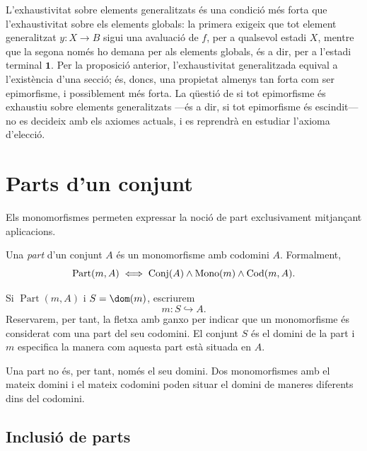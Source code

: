 \begin{observacio}\label{obs:exhaustiva-generalitzada-global}
L'exhaustivitat sobre elements generalitzats és una condició més forta que l'exhaustivitat sobre els elements globals: la primera exigeix que tot element generalitzat \(y:X\to B\) sigui una avaluació de \(f\), per a qualsevol estadi \(X\), mentre que la segona només ho demana per als elements globals, és a dir, per a l'estadi terminal \(\mathbf1\). Per la proposició anterior, l'exhaustivitat generalitzada equival a l'existència d'una secció; és, doncs, una propietat almenys tan forta com ser epimorfisme, i possiblement més forta. La qüestió de si tot epimorfisme és exhaustiu sobre elements generalitzats ---és a dir, si tot epimorfisme és escindit--- no es decideix amb els axiomes actuals, i es reprendrà en estudiar l'axioma d'elecció.
\end{observacio}

\section{Parts d'un conjunt}\label{sec:parts}

Els monomorfismes permeten expressar la noció de part exclusivament mitjançant aplicacions.

\begin{definicio}[Part]\label{def:part}
Una \emph{part} d'un conjunt \(A\) és un monomorfisme amb codomini \(A\). Formalment,
\[
\operatorname{Part}(m,A)
\iff
\operatorname{Conj}(A)\land\operatorname{Mono}(m)\land\operatorname{Cod}(m,A).
\]
\end{definicio}

\begin{notacio}\label{not:part}
Si \(\operatorname{Part}(m,A)\) i \(S=\dom(m)\), escriurem
\[
m:S\hookrightarrow A.
\]
Reservarem, per tant, la fletxa amb ganxo per indicar que un monomorfisme és considerat com una part del seu codomini. El conjunt \(S\) és el domini de la part i \(m\) especifica la manera com aquesta part està situada en \(A\).
\end{notacio}

Una part no és, per tant, només el seu domini. Dos monomorfismes amb el mateix domini i el mateix codomini poden situar el domini de maneres diferents dins del codomini.

\subsection{Inclusió de parts}\label{sec:inclusio-parts}

